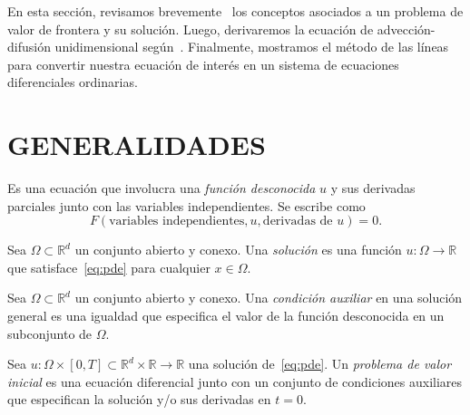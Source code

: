 En esta sección, revisamos
brevemente~\citep{choksi_partial_2022,salgado_classical_2022} los
conceptos asociados a un problema de valor de frontera y su solución.
Luego, derivaremos la ecuación de advección-difusión unidimensional
según~\citep{leveque_numerical_1992}.
Finalmente, mostramos el método de las líneas para convertir nuestra
ecuación de interés en un sistema de ecuaciones diferenciales
ordinarias.

\section{GENERALIDADES}

\begin{definition}
    Es una ecuación que involucra una \emph{función desconocida} $u$
    y sus derivadas parciales junto con las variables independientes.
    Se escribe como
    \begin{equation}
        \boxed{
            F\left(
            \text{variables independientes},
            u,
            \text{derivadas de $u$}
            \right)
            =0
        }.\label{eq:pde}
    \end{equation}
\end{definition}

\begin{definition}
    Sea $\Omega\subset\mathbb{R}^{d}$ un conjunto abierto y conexo.
    Una \emph{solución} es una función $u\colon\Omega\to\mathbb{R}$
    que satisface~\eqref{eq:pde} para cualquier $x\in\Omega$.
\end{definition}

\begin{definition}
    Sea $\Omega\subset\mathbb{R}^{d}$ un conjunto abierto y conexo.
    Una \emph{condición auxiliar} en una solución general es una
    igualdad que especifica el valor de la función desconocida en un
    subconjunto de $\Omega$.
\end{definition}

\begin{definition}
    Sea
    \begin{math}
        u\colon
        \Omega\times\left[0,T\right]\subset
        \mathbb{R}^{d}\times\mathbb{R}\to
        \mathbb{R}
    \end{math}
    una solución de~\eqref{eq:pde}.
    Un \emph{problema de valor inicial} es una ecuación diferencial
    junto con un conjunto de condiciones auxiliares que especifican
    la solución y/o sus derivadas en $t=0$.
\end{definition}

